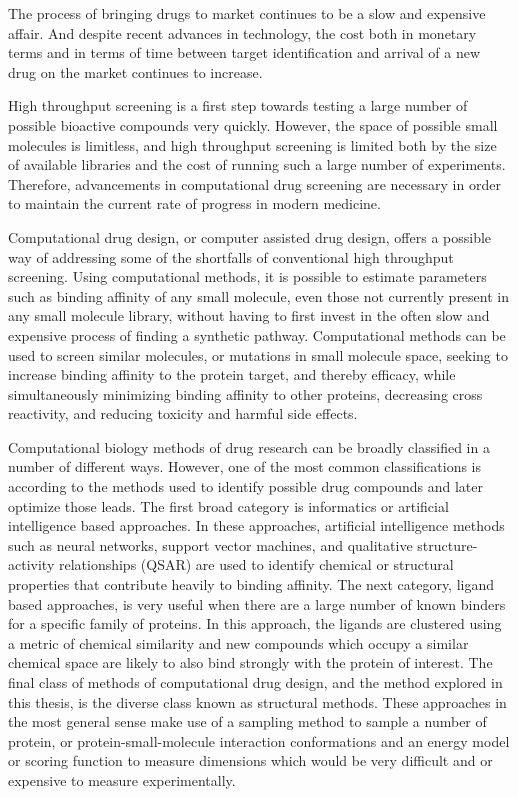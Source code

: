 The process of bringing drugs to market continues to be a slow and expensive affair.
And despite recent advances in technology, the cost both in monetary terms and in terms of time between target identification and arrival of a new drug on the market continues to increase.

High throughput screening is a first step towards testing a large number of possible bioactive compounds very quickly.
However, the space of possible small molecules is limitless, and high throughput screening is limited both by the size of available libraries and the cost of running such a large number of experiments.
Therefore, advancements in computational drug screening are necessary in order to maintain the current rate of progress in modern medicine.

Computational drug design, or computer assisted drug design, offers a possible way of addressing some of the shortfalls of conventional high throughput screening.
Using computational methods, it is possible to estimate parameters such as binding affinity of any small molecule, even those not currently present in any small molecule library, without having to first invest in the often slow and expensive process of finding a synthetic pathway.
Computational methods can be used to screen similar molecules, or mutations in small molecule space, seeking to increase binding affinity to the protein target, and thereby efficacy, while simultaneously minimizing binding affinity to other proteins, decreasing cross reactivity, and reducing toxicity and harmful side effects.

Computational biology methods of drug research can be broadly classified in a number of different ways.
However, one of the most common classifications is according to the methods used to identify possible drug compounds and later optimize those leads.
The first broad category is informatics or artificial intelligence based approaches.
In these approaches, artificial intelligence methods such as neural networks, support vector machines, and qualitative structure-activity relationships (QSAR) are used to identify chemical or structural properties that contribute heavily to binding affinity.
The next category, ligand based approaches, is very useful when there are a large number of known binders for a specific family of proteins.
In this approach, the ligands are clustered using a metric of chemical similarity and new compounds which occupy a similar chemical space are likely to also bind strongly with the protein of interest.
The final class of methods of computational drug design, and the method explored in this thesis, is the diverse class known as structural methods.
These approaches in the most general sense make use of a sampling method to sample a number of protein, or protein-small-molecule interaction conformations and an energy model or scoring function to measure dimensions which would be very difficult and or expensive to measure experimentally.

